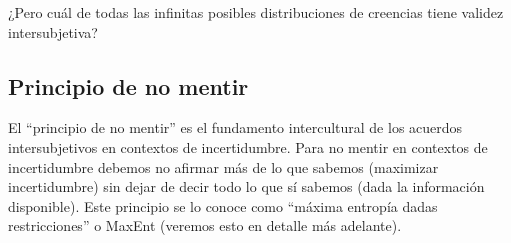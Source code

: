 \documentclass[a4paper,11pt]{book}
\theoremstyle{definition}
\begin{document}

¿Pero cu\'al de todas las infinitas posibles distribuciones de creencias tiene validez intersubjetiva?

\subsection{Principio de no mentir}\label{sec:principio_indiferencia}

El ``principio de no mentir'' es el fundamento intercultural de los acuerdos intersubjetivos en contextos de incertidumbre.
%
Para no mentir en contextos de incertidumbre debemos no afirmar más de lo que sabemos (maximizar incertidumbre) sin dejar de decir todo lo que sí sabemos (dada la información disponible).
%
Este principio se lo conoce como ``máxima entropía dadas restricciones'' o MaxEnt (veremos esto en detalle más adelante).

\end{document}
